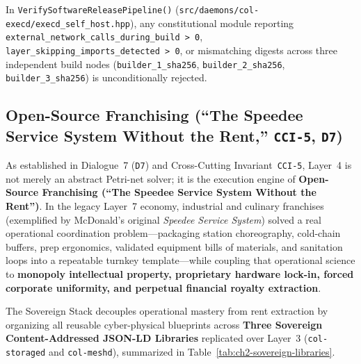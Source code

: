 In \texttt{VerifySoftwareReleasePipeline()}
(\texttt{src/daemons/col-execd/execd\_self\_host.hpp}), any constitutional module reporting
\texttt{external\_network\_calls\_during\_build > 0},
\texttt{layer\_skipping\_imports\_detected > 0}, or mismatching digests across three
independent build nodes (\texttt{builder\_1\_sha256}, \texttt{builder\_2\_sha256},
\texttt{builder\_3\_sha256}) is unconditionally rejected.

\subsection{Open-Source Franchising (``The Speedee Service System Without the Rent,'' \texttt{CCI-5}, \texttt{D7})}
\label{subsec:ch2-open-source-franchising}

As established in Dialogue~7 (\texttt{D7}) and Cross-Cutting Invariant~\texttt{CCI-5}, Layer~4
is not merely an abstract Petri-net solver; it is the execution engine of \textbf{Open-Source
Franchising (``The Speedee Service System Without the Rent'')}. In the legacy Layer~7
economy, industrial and culinary franchises (exemplified by McDonald's original
\textit{Speedee Service System}) solved a real operational coordination problem---packaging
station choreography, cold-chain buffers, prep ergonomics, validated equipment bills of
materials, and sanitation loops into a repeatable turnkey template---while coupling that
operational science to \textbf{monopoly intellectual property, proprietary hardware lock-in,
forced corporate uniformity, and perpetual financial royalty extraction}.

The Sovereign Stack decouples operational mastery from rent extraction by organizing all
reusable cyber-physical blueprints across \textbf{Three Sovereign Content-Addressed JSON-LD
Libraries} replicated over Layer~3 (\texttt{col-storaged} and \texttt{col-meshd}), summarized
in Table~\ref{tab:ch2-sovereign-libraries}.

